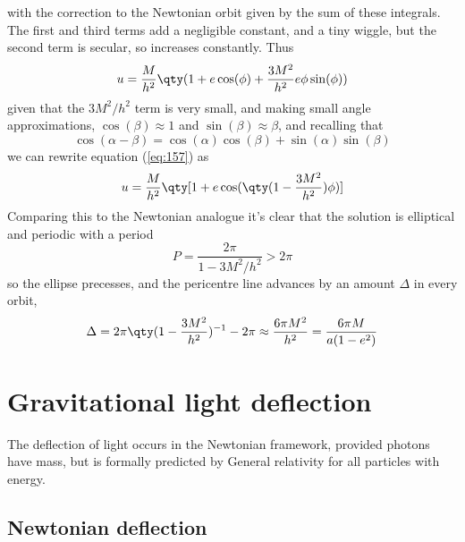 with the correction to the Newtonian orbit given by the sum of these
integrals. The first and third terms add a negligible constant, and a
tiny wiggle, but the second term is secular, so increases constantly.
Thus
\begin{equation}
  \label{eq:157}
  u = \frac{M}{h^2} \qty( 1+ e \cos(\phi) + \frac{3M^2}{h^2} e \phi \sin(\phi) )
\end{equation}
given that the $3M^2/h^2$ term is very small, and making small angle
approximations, $\cos(\beta)\approx 1$ and $\sin(\beta)\approx \beta$,
and recalling that
\[ \cos(\alpha-\beta) = \cos(\alpha) \cos(\beta) + \sin(\alpha) \sin(\beta) \]
we can rewrite equation (\ref{eq:157}) as
\begin{equation}
  \label{eq:158}
  u  =\frac{M}{h^2} \qty[1 + e \cos( \qty( 1 - \frac{3M^2}{h^2}) \phi )]
\end{equation}
Comparing this to the Newtonian analogue it's clear that the solution
is elliptical and periodic with a period
\begin{equation}
  \label{eq:159}
  P = \frac{2 \pi}{1 - 3M^2/h^2} > 2 \pi
\end{equation}
so the ellipse precesses, and the pericentre line advances by an
amount $\Delta$ in every orbit,
\begin{equation}
  \label{eq:160}
  \Delta = 2 \pi \qty( 1 - \frac{3M^2}{h^2})^{-1} - 2 \pi \approx \frac{6 \pi M^2}{h^2} = \frac{6 \pi M}{a(1-e^2)}
\end{equation}



\section{Gravitational light deflection}
\label{sec:grav-light-defl}

The deflection of light occurs in the Newtonian framework, provided
photons have mass, but is formally predicted by General relativity for
all particles with energy.

\subsection{Newtonian deflection}
\label{sec:newtonian-deflection}

